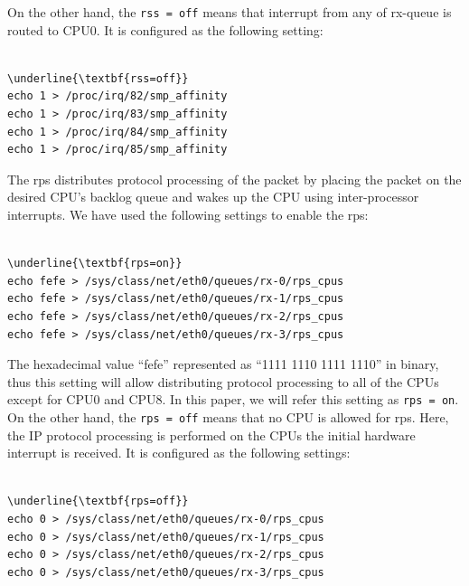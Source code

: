 On the other hand, the {\tt rss = off} means that interrupt from any of rx-queue is routed to CPU0. 
It is configured as the following setting:

\begin{center}
\begin{minipage}{0.8\columnwidth}
\begin{Verbatim}[commandchars=\\\{\}]

\underline{\textbf{rss=off}}
echo 1 > /proc/irq/82/smp_affinity
echo 1 > /proc/irq/83/smp_affinity
echo 1 > /proc/irq/84/smp_affinity
echo 1 > /proc/irq/85/smp_affinity

\end{Verbatim}
\end{minipage}
\end{center}


The rps distributes protocol processing of the packet by placing the packet
on the desired CPU's backlog queue and wakes up the CPU using inter-processor interrupts.
We have used the following settings to enable the rps:

\begin{center}
\begin{minipage}{0.8\columnwidth}
\begin{Verbatim}[commandchars=\\\{\}]

\underline{\textbf{rps=on}}
echo fefe > /sys/class/net/eth0/queues/rx-0/rps_cpus
echo fefe > /sys/class/net/eth0/queues/rx-1/rps_cpus
echo fefe > /sys/class/net/eth0/queues/rx-2/rps_cpus
echo fefe > /sys/class/net/eth0/queues/rx-3/rps_cpus

\end{Verbatim}
\end{minipage}
\end{center}

The hexadecimal value \enquote{fefe} represented as \enquote{1111 1110 1111 1110} in binary, 
thus this setting will allow distributing protocol processing to all of the CPUs except for CPU0 and CPU8.
In this paper, we will refer this setting as {\tt rps = on}.
%
On the other hand, the {\tt rps = off} means that no CPU is allowed for rps. 
Here, the IP protocol processing is performed on the CPUs the initial hardware interrupt is received.
It is configured as the following settings:

\begin{center}
\begin{minipage}{0.8\columnwidth}
\begin{Verbatim}[commandchars=\\\{\}]

\underline{\textbf{rps=off}}
echo 0 > /sys/class/net/eth0/queues/rx-0/rps_cpus
echo 0 > /sys/class/net/eth0/queues/rx-1/rps_cpus
echo 0 > /sys/class/net/eth0/queues/rx-2/rps_cpus
echo 0 > /sys/class/net/eth0/queues/rx-3/rps_cpus

\end{Verbatim}
\end{minipage}
\end{center}

